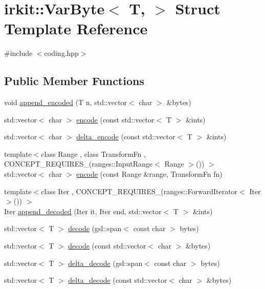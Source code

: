 \hypertarget{structirkit_1_1VarByte}{}\section{irkit\+:\+:Var\+Byte$<$ T, $>$ Struct Template Reference}
\label{structirkit_1_1VarByte}


{\ttfamily \#include $<$coding.\+hpp$>$}

\subsection*{Public Member Functions}
\begin{DoxyCompactItemize}
\item 
void \hyperlink{structirkit_1_1VarByte_aa5418ece5dab50514de2825be2fda530}{append\+\_\+encoded} (T n, std\+::vector$<$ char $>$ \&bytes)
\item 
std\+::vector$<$ char $>$ \hyperlink{structirkit_1_1VarByte_a8ac67e74ce059c904c5573cf46643ffe}{encode} (const std\+::vector$<$ T $>$ \&ints)
\item 
std\+::vector$<$ char $>$ \hyperlink{structirkit_1_1VarByte_a0182cbcb0c80705b7effe6cb2dc7cd6b}{delta\+\_\+encode} (const std\+::vector$<$ T $>$ \&ints)
\item 
{\footnotesize template$<$class Range , class Transform\+Fn , C\+O\+N\+C\+E\+P\+T\+\_\+\+R\+E\+Q\+U\+I\+R\+E\+S\+\_\+(ranges\+::\+Input\+Range$<$ Range $>$()) $>$ }\\std\+::vector$<$ char $>$ \hyperlink{structirkit_1_1VarByte_a9125fe467a53a0556bd642c09d5d2d27}{encode} (const Range \&range, Transform\+Fn fn)
\item 
{\footnotesize template$<$class Iter , C\+O\+N\+C\+E\+P\+T\+\_\+\+R\+E\+Q\+U\+I\+R\+E\+S\+\_\+(ranges\+::\+Forward\+Iterator$<$ Iter $>$()) $>$ }\\Iter \hyperlink{structirkit_1_1VarByte_a6f71f45fca0f585b4d7c0a704c214f81}{append\+\_\+decoded} (Iter it, Iter end, std\+::vector$<$ T $>$ \&ints)
\item 
std\+::vector$<$ T $>$ \hyperlink{structirkit_1_1VarByte_aaf5f6ea6d9d7e2e739dc15defaf89892}{decode} (gsl\+::span$<$ const char $>$ bytes)
\item 
std\+::vector$<$ T $>$ \hyperlink{structirkit_1_1VarByte_af3b00fc21d45e56ce87ccc06626e55c5}{decode} (const std\+::vector$<$ char $>$ \&bytes)
\item 
std\+::vector$<$ T $>$ \hyperlink{structirkit_1_1VarByte_a4f36c3ebab2071ebd9d47f4e3e4f3a42}{delta\+\_\+decode} (gsl\+::span$<$ const char $>$ bytes)
\item 
std\+::vector$<$ T $>$ \hyperlink{structirkit_1_1VarByte_aefcc29aed7e2f454dadcc869eea99201}{delta\+\_\+decode} (const std\+::vector$<$ char $>$ \&bytes)
\end{DoxyCompactItemize}


